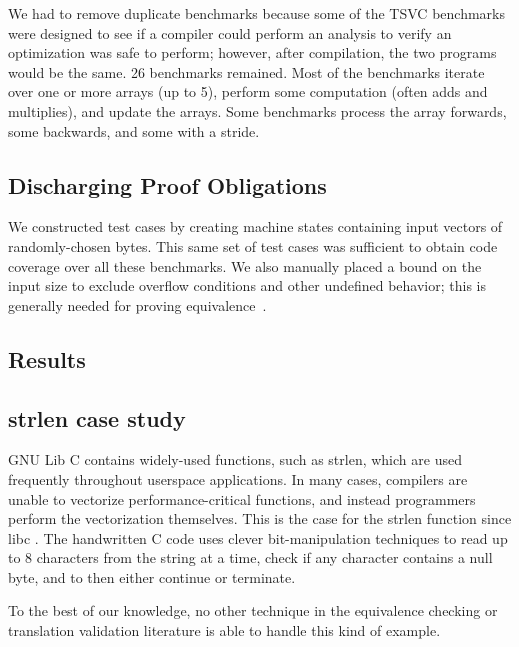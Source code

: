 We had to remove duplicate benchmarks because some of the TSVC
benchmarks were designed to see if a compiler could perform an
analysis to verify an optimization was safe to perform; however,
after compilation, the two programs would be the same. 26 benchmarks
remained. Most of the benchmarks iterate over one or more arrays (up
to 5), perform some computation (often adds and multiplies), and
update the arrays. Some benchmarks process the array forwards, some
backwards, and some with a stride.

\subsection{Discharging Proof Obligations}

We constructed test cases by creating machine states containing input
vectors of randomly-chosen bytes. This same set of test cases was
sufficient to obtain code coverage over all these benchmarks. We
also manually placed a bound on the input size to exclude overflow
conditions and other undefined behavior; this is generally needed for
proving equivalence~\cite{Dahiya17HVC}.









\subsection{Results}

\subsection{strlen case study}

GNU Lib C contains widely-used functions, such as strlen, which are
used frequently throughout userspace applications. In many cases,
compilers are unable to vectorize performance-critical functions, and
instead programmers perform the vectorization themselves. This is the
case for the strlen function since libc . The
handwritten C code uses clever bit-manipulation techniques to read
up to 8 characters from the string at a time, check if any character
contains a null byte, and to then either continue or terminate.

To the best of our knowledge, no other technique in the equivalence
checking or translation validation literature is able to handle this
kind of example. 
